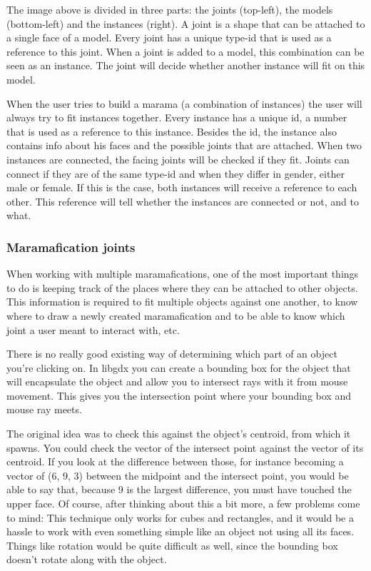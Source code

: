 \documentclass[10pt]{extarticle} %
\begin{document}
    The image above is divided in three parts: the joints (top-left), the models (bottom-left) and the instances (right).
    A joint is a shape that can be attached to a single face of a model.
    Every joint has a unique type-id that is used as a reference to this joint.
    When a joint is added to a model, this combination can be seen as an instance.
    The joint will decide whether another instance will fit on this model.

    When the user tries to build a marama (a combination of instances) the user will always try to fit instances together.
    Every instance has a unique id, a number that is used as a reference to this instance.
    Besides the id, the instance also contains info about his faces and the possible joints that are attached.
    When two instances are connected, the facing joints will be checked if they fit.
    Joints can connect if they are of the same type-id and when they differ in gender, either male or female.
    If this is the case, both instances will receive a reference to each other.
    This reference will tell whether the instances are connected or not, and to what.

    \subsubsection{Maramafication joints}
    When working with multiple maramafications, one of the most important things to do is keeping track of the places where they can be attached to other objects.
    This information is required to fit multiple objects against one another, to know where to draw a newly created maramafication and to be able to know which joint a user meant to interact with, etc.

    There is no really good existing way of determining which part of an object you're clicking on.
    In libgdx you can create a bounding box for the object that will encapsulate the object and allow you to intersect rays with it from mouse movement.
    This gives you the intersection point where your bounding box and mouse ray meets.

    The original idea was to check this against the object's centroid, from which it spawns.
    You could check the vector of the intersect point against the vector of its centroid.
    If you look at the difference between those, for instance becoming a vector of (6, 9, 3) between the midpoint and the intersect point, you would be able to say that, because 9 is the largest difference, you must have touched the upper face.
    Of course, after thinking about this a bit more, a few problems come to mind:
    This technique only works for cubes and rectangles, and it would be a hassle to work with even something simple like an object not using all its faces.
    Things like rotation would be quite difficult as well, since the bounding box doesn't rotate along with the object.
\end{document}
